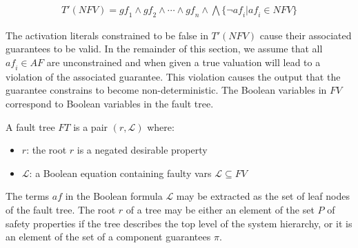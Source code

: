 \begin{gather*}
T'(\mathit{NFV}) = \mathit{gf_1} \land \mathit{gf_2} \land \cdots \land \mathit{gf_n} \land \bigwedge \{\neg \mathit{af_i} | \mathit{af_i} \in \mathit{NFV} \}
\end{gather*}

The activation literals constrained to be false in $T'(\mathit{NFV})$ cause their associated guarantees to be valid. In the remainder of this section, we assume that all $\mathit{af_i} \in \mathit{AF}$ are unconstrained and when given a true valuation will lead to a violation of the associated guarantee. This violation causes the output that the guarantee constrains to become non-deterministic. The Boolean variables in $\mathit{FV}$ correspond to Boolean variables in the fault tree. 



\begin{definition}
A fault tree $\mathit{FT}$ is a pair $(r, \mathcal{L})$ where:
\begin{itemize}
\item[] $r$: the root $r$ is a negated desirable property
\item[] $\mathcal{L}$: a Boolean equation containing faulty vars $\mathcal{L} \subseteq \mathit{FV}$
\end{itemize}
\end{definition}

The terms $\mathit{af}$  in the Boolean formula $\mathcal{L}$ may be extracted as the set of leaf nodes of the fault tree. The root $r$ of a tree may be either an element of the set $P$ of safety properties if the tree describes the top level of the system hierarchy, or it is an element of the set of a component guarantees $\pi$. 

